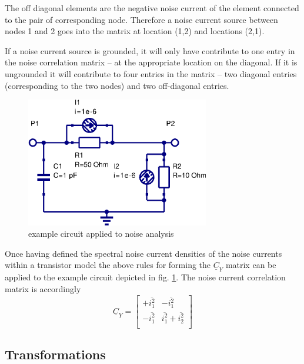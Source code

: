 \addvspace{12pt}

The off diagonal elements are the negative noise current of the
element connected to the pair of corresponding node.  Therefore a
noise current source between nodes 1 and 2 goes into the matrix at
location (1,2) and locations (2,1).

\addvspace{12pt}

If a noise current source is grounded, it will only have contribute to
one entry in the noise correlation matrix -- at the appropriate
location on the diagonal.  If it is ungrounded it will contribute to
four entries in the matrix -- two diagonal entries (corresponding to
the two nodes) and two off-diagonal entries.

\begin{figure}[ht]
\begin{center}
\includegraphics[width=8cm]{CYexample}
\end{center}
\caption{example circuit applied to noise analysis}
\label{fig:CYexample}
\end{figure}
\FloatBarrier

Once having defined the spectral noise current densities of the noise
currents within a transistor model the above rules for forming the
$\underline{C}_Y$ matrix can be applied to the example circuit
depicted in fig. \ref{fig:CYexample}.  The noise current
correlation matrix is accordingly
\begin{equation}
\underline{C}_Y =
\begin{bmatrix}
+\overline{i_1^2} & -\overline{i_1^2}\\
-\overline{i_1^2} & \overline{i_1^2} + \overline{i_2^2}\\
\end{bmatrix}
\end{equation}

\subsection{Transformations}
\label{sec:noiseTrans}

